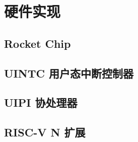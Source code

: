 
\chapter{硬件实现}

\section{Rocket Chip}

\section{UINTC 用户态中断控制器}

\section{UIPI 协处理器}

\section{RISC-V N 扩展}
